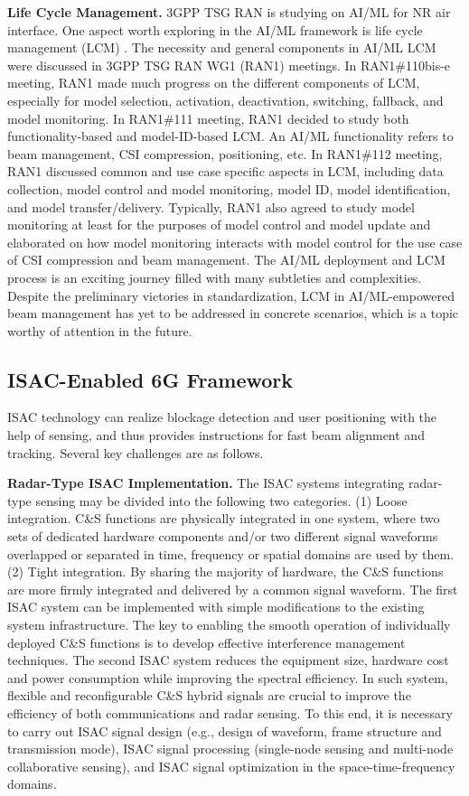 \documentclass[journal,comsoc]{IEEEtran}
\begin{document}
{\bf{Life Cycle Management.}} 3GPP TSG RAN is studying on AI/ML for NR air interface. One aspect worth exploring in the AI/ML framework is life cycle management (LCM) \cite{R1-2301586}. The necessity and general components in AI/ML LCM were discussed in 3GPP TSG RAN WG1 (RAN1) meetings. In RAN1\#110bis-e meeting, RAN1 made much progress on the different components of LCM, especially for model selection, activation, deactivation, switching, fallback, and model monitoring. In RAN1\#111 meeting, RAN1 decided to study both functionality-based and model-ID-based LCM. An AI/ML functionality refers to beam management, CSI compression, positioning, etc. In RAN1\#112 meeting, RAN1 discussed common and use case specific aspects in LCM, including data collection, model control and model monitoring, model ID, model identification, and model transfer/delivery. Typically, RAN1 also agreed to study model monitoring at least for the purposes of model control and model update and elaborated on how model monitoring interacts with model control for the use case of CSI compression and beam management. The AI/ML deployment and LCM process is an exciting journey filled with many subtleties and complexities. Despite the preliminary victories in standardization, LCM in AI/ML-empowered beam management has yet to be addressed in concrete scenarios, which is a topic worthy of attention in the future.


\subsection{ISAC-Enabled 6G Framework}
ISAC technology can realize blockage detection and user positioning with the help of sensing, and thus provides instructions for fast beam alignment and tracking. Several key challenges are as follows.

{\bf{Radar-Type ISAC Implementation.}} The ISAC systems integrating radar-type sensing may be divided into the following two categories. (1) Loose integration. C\&S functions are physically integrated in one system, where two sets of dedicated hardware components and/or two different signal waveforms overlapped or separated in time, frequency or spatial domains are used by them. (2) Tight integration. By sharing the majority of hardware, the C\&S functions are more firmly integrated and delivered by a common signal waveform. The first ISAC system can be implemented with simple modifications to the existing system infrastructure. The key to enabling the smooth operation of individually deployed C\&S functions is to develop effective interference management techniques. The second ISAC system reduces the equipment size, hardware cost and power consumption while improving the spectral efficiency. In such system, flexible and reconfigurable C\&S hybrid signals are crucial to improve the efficiency of both communications and radar sensing. To this end, it is necessary to carry out ISAC signal design (e.g., design of waveform, frame structure and transmission mode), ISAC signal processing (single-node sensing and multi-node collaborative sensing), and ISAC signal optimization in the space-time-frequency domains.
\end{document}
